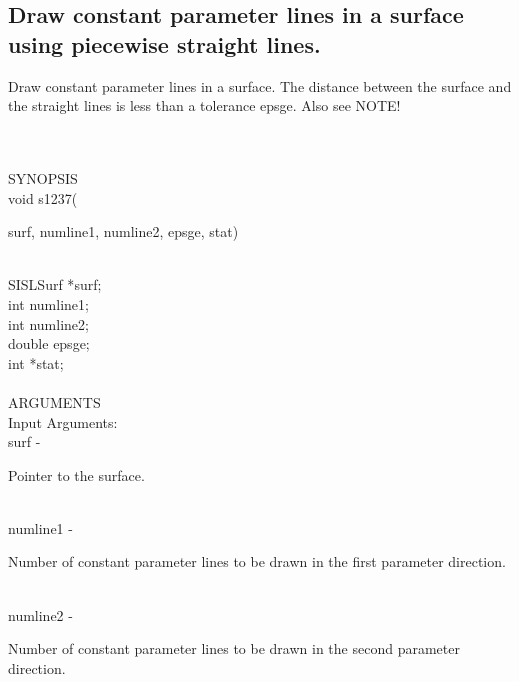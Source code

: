 \subsection{Draw constant parameter lines in a surface
using piecewise straight lines.}
\begin{minipg1}
  Draw constant parameter lines in a surface.
  The distance between the surface and the
  straight lines is less than a tolerance epsge. Also see NOTE!
\end{minipg1} \\ \\
SYNOPSIS\\
        \>void s1237(\begin{minipg3}
                                {\fov surf}, {\fov numline1}, {\fov numline2}, {\fov epsge}, {\fov stat})
                \end{minipg3}\\[0.3ex]
                \>\>    SISLSurf        \>      *{\fov surf};\\
                \>\>    int     \>      {\fov numline1};\\
                \>\>    int     \>      {\fov numline2};\\
                \>\>    double  \>      {\fov epsge};\\
                \>\>    int     \>      *{\fov stat};\\
\\
ARGUMENTS\\
        \>Input Arguments:\\
        \>\>    {\fov surf}\> - \>      \begin{minipg2}
                                Pointer to the surface.
                                \end{minipg2}\\
        \>\>    {\fov numline1}\> - \>  \begin{minipg2}
                                Number of constant parameter lines to be drawn in the first
                                parameter direction.
                                \end{minipg2}\\[0.3ex]
        \>\>    {\fov numline2}\> - \>  \begin{minipg2}
                                Number of constant parameter lines to be drawn in the
                                second parameter direction.
                                \end{minipg2}\\[0.3ex]
